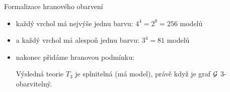 \documentclass{beamer}
\begin{document}
\begin{frame}{Formalizace hranového obarvení}

    \begin{itemize}
        \item každý vrchol má nejvýše jednu barvu: $4^4=2^8=256$ modelů\medskip


        \pause
        \medskip

        \item a každý vrchol má alespoň jednu barvu: $3^4=81$ modelů\medskip
        

        \pause
        \medskip
        

        \pause
        \medskip

        \item nakonec přidáme \alert{hranovou podmínku}:\medskip
        

        \pause
        \medskip

        Výsledná teorie \( T_3 \) je \alert{splnitelná} (má model), právě když je graf \( \mathcal{G} \) 3-obarvitelný.   
    \end{itemize}

\end{frame}
\end{document}
